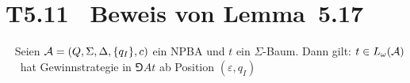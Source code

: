 \documentclass[fontsize=11pt, twoside=false, numbers=autoenddot]{scrbook}
\begin{document}
\goodbreak
%
%

\section*{T5.11~ Beweis von Lemma~5.17}

~
Seien $\mathcal{A} = (Q,\Sigma,\Delta,\{q_I\},c)$ ein NPBA und $t$ ein $\Sigma$-Baum.
Dann gilt:
$t \in L_\omega(\mathcal{A})$ ~~ \AUT hat Gewinnstrategie in $\Game{A}{t}$ ab Position $(\varepsilon,q_I)$
\end{document}
